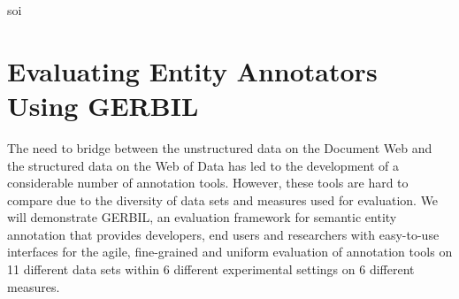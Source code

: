 soi%





%

\chapter{Evaluating Entity Annotators Using GERBIL}




The need to bridge between the unstructured data on the Document Web and the structured data on the Web of Data has led to the development of a considerable number of annotation tools. However, these tools are hard to compare due to the diversity of data sets and measures used for evaluation. 
We will demonstrate GERBIL, an evaluation framework for semantic entity annotation that provides developers, end users and researchers with easy-to-use interfaces for the agile, fine-grained and uniform evaluation of annotation tools on 11 different data sets within 6 different experimental settings on 6 different measures. 


